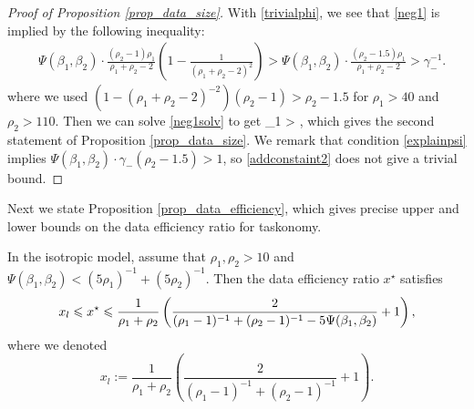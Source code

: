 \begin{proof}[Proof of Proposition \ref{prop_data_size}]
With \eqref{trivialphi}, we see that \eqref{neg1} is implied by the following inequality:
\begin{align}\label{neg1solv}
 & \Psi(\beta_1,\beta_2)  \cdot \frac{(\rho_2-1) \rho_1 }{\rho_1+\rho_2-2}\left( 1-\frac{1}{(\rho_1+\rho_2-2)^2}\right) >  \Psi(\beta_1,\beta_2)  \cdot \frac{(\rho_2-1.5) \rho_1 }{\rho_1+\rho_2-2}> \gamma_-^{-1} .
 \end{align}
 where we used $(1-(\rho_1+\rho_2-2)^{-2})(\rho_2 - 1) > \rho_2-1.5$ for $\rho_1>40$ and $\rho_2>110$. Then we can solve \eqref{neg1solv} to get
 \be\label{addconstaint2}
 \rho_1 >   ,
 \ee
which gives the second statement of Proposition \ref{prop_data_size}.
We remark that condition \eqref{explainpsi} implies $\Psi(\beta_1, \beta_2) \cdot \gamma_-(\rho_2 - 1.5)>1$, so \eqref{addconstaint2} does not give a trivial bound. 
 \end{proof}
 
Next we state Proposition \ref{prop_data_efficiency}, which gives precise upper and lower bounds on the data efficiency ratio for taskonomy. %

\begin{proposition}\label{prop_data_efficiency}
	In the isotropic model, assume that $\rho_1,\rho_2 > 10$ and $\Psi(\beta_1, \beta_2) < (5\rho_1)^{-1} + (5\rho_2)^{-1}$.
	Then the data efficiency ratio $x^\star$ satisfies 
	\[ x_l  \leqslant x^\star\leqslant \frac{1}{\rho_1 + \rho_2} \left({  \frac{2}{(\rho_1-1)^{-1} + (\rho_2-1)^{-1} - 5\Psi(\beta_1, \beta_2)}+1}\right), \]
	where we denoted
	$$x_l:= \frac1{\rho_1+\rho_2}\left(\frac{2}{(\rho_1-1)^{-1}+(\rho_2 -1)^{-1}}+1\right).$$
\end{proposition}


